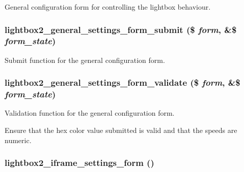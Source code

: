 General configuration form for controlling the lightbox behaviour. \hypertarget{lightbox2_8admin_8inc_a58d07e2b25cde85683aff03ed5fa405}{
\subsubsection[{lightbox2\_\-general\_\-settings\_\-form\_\-submit}]{\setlength{\rightskip}{0pt plus 5cm}lightbox2\_\-general\_\-settings\_\-form\_\-submit (\$ {\em form}, \/  \&\$ {\em form\_\-state})}}
\label{lightbox2_8admin_8inc_a58d07e2b25cde85683aff03ed5fa405}


Submit function for the general configuration form. \hypertarget{lightbox2_8admin_8inc_05ca8e985693d1555059fff473a6c5fe}{
\subsubsection[{lightbox2\_\-general\_\-settings\_\-form\_\-validate}]{\setlength{\rightskip}{0pt plus 5cm}lightbox2\_\-general\_\-settings\_\-form\_\-validate (\$ {\em form}, \/  \&\$ {\em form\_\-state})}}
\label{lightbox2_8admin_8inc_05ca8e985693d1555059fff473a6c5fe}


Validation function for the general configuration form.

Ensure that the hex color value submitted is valid and that the speeds are numeric. \hypertarget{lightbox2_8admin_8inc_a5ab39b865daa5496b0cd9340353fdc5}{
\subsubsection[{lightbox2\_\-iframe\_\-settings\_\-form}]{\setlength{\rightskip}{0pt plus 5cm}lightbox2\_\-iframe\_\-settings\_\-form ()}}
\label{lightbox2_8admin_8inc_a5ab39b865daa5496b0cd9340353fdc5}


